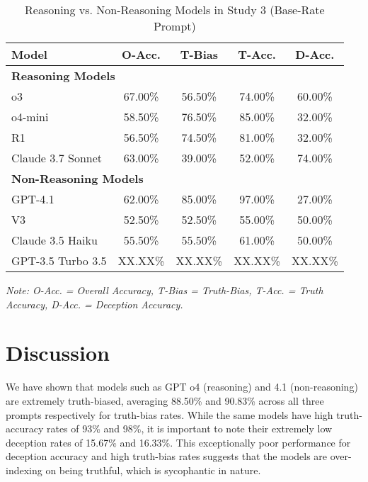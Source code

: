 \documentclass{article}
\begin{document}
\begin{table}[ht]
\centering
\caption{Reasoning vs. Non-Reasoning Models in Study 3 (Base-Rate Prompt)}
\begin{tabular}{lcccc}
\toprule
\textbf{Model} & \textbf{O-Acc.} & \textbf{T-Bias} & \textbf{T-Acc.} & \textbf{D-Acc.} \\
\midrule
\multicolumn{5}{l}{\textbf{Reasoning Models}} \\
o3 & 67.00\% & 56.50\% & 74.00\% & 60.00\% \\
o4-mini & 58.50\% & 76.50\% & 85.00\% & 32.00\% \\
R1 & 56.50\% & 74.50\% & 81.00\% & 32.00\% \\
Claude 3.7 Sonnet & 63.00\% & 39.00\% & 52.00\% & 74.00\% \\
\midrule
\multicolumn{5}{l}{\textbf{Non-Reasoning Models}} \\
GPT-4.1 & 62.00\% & 85.00\% & 97.00\% & 27.00\% \\
V3 & 52.50\% & 52.50\% & 55.00\% & 50.00\% \\
Claude 3.5 Haiku & 55.50\% & 55.50\% & 61.00\% & 50.00\% \\
GPT-3.5 Turbo 3.5 & XX.XX\% & XX.XX\% & XX.XX\% & XX.XX\% \\
\bottomrule
\end{tabular}
\begin{minipage}{0.7\linewidth}
\vspace{0.05in}
\footnotesize
\textit{Note: O-Acc. = Overall Accuracy, T-Bias = Truth-Bias, T-Acc. = Truth Accuracy, D-Acc. = Deception Accuracy.}
\end{minipage}
\label{tab:study1_model_comparison}
\end{table}

\section{Discussion}

We have shown that models such as GPT o4 (reasoning) and 4.1 (non-reasoning) are extremely truth-biased, averaging 88.50\% and 90.83\% across all three prompts respectively for truth-bias rates. While the same models have high truth-accuracy rates of 93\% and 98\%, it is important to note their extremely low deception rates of 15.67\% and 16.33\%. This exceptionally poor performance for deception accuracy and high truth-bias rates suggests that the models are over-indexing on being truthful, which is sycophantic in nature.
\end{document}
